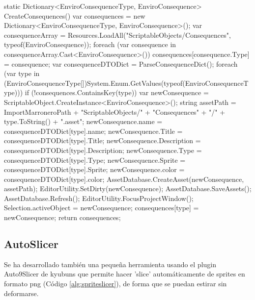 \begin{mypython}[caption={Código para autogenerar ScriptableObject de tipo EnviroConsequences.},label={alg:enviroSO2}]
static Dictionary<EnviroConsequenceType, EnviroConsequence> CreateConsequences()
{
    var consequences = new Dictionary<EnviroConsequenceType, EnviroConsequence>();
    var consequenceArray = Resources.LoadAll("ScriptableObjects/Consequences", typeof(EnviroConsequence));
    foreach (var consequence in consequenceArray.Cast<EnviroConsequence>())
    {
        consequences[consequence.Type] = consequence;
    }
    var consequenceDTODict = ParseConsequenceDict();
    foreach (var type in (EnviroConsequenceType[])System.Enum.GetValues(typeof(EnviroConsequenceType)))
    {
        if (!consequences.ContainsKey(type))
        {
            var newConsequence = ScriptableObject.CreateInstance<EnviroConsequence>();
            string assetPath = ImportMarroneroPath + "ScriptableObjects/" + "Consequences" + "/" + type.ToString() + ".asset";
            newConsequence.name = consequenceDTODict[type].name;
            newConsequence.Title = consequenceDTODict[type].Title;
            newConsequence.Description = consequenceDTODict[type].Description;
            newConsequence.Type = consequenceDTODict[type].Type;
            newConsequence.Sprite = consequenceDTODict[type].Sprite;
            newConsequence.color = consequenceDTODict[type].color;
            AssetDatabase.CreateAsset(newConsequence, assetPath);
            EditorUtility.SetDirty(newConsequence);
            AssetDatabase.SaveAssets();
            AssetDatabase.Refresh();
            EditorUtility.FocusProjectWindow();
            Selection.activeObject = newConsequence;
            consequences[type] = newConsequence;
        }
    }
    return consequences;
}
\end{mypython}

\subsection{AutoSlicer}

Se ha desarrollado también una pequeña herramienta usando el plugin Auto9Slicer\cite{Auto9Slicer} de kyubuns que permite hacer 'slice' automáticamente de sprites en formato png (Código \ref{alg:spriteslicer}), de forma que se puedan estirar sin deformarse. 

